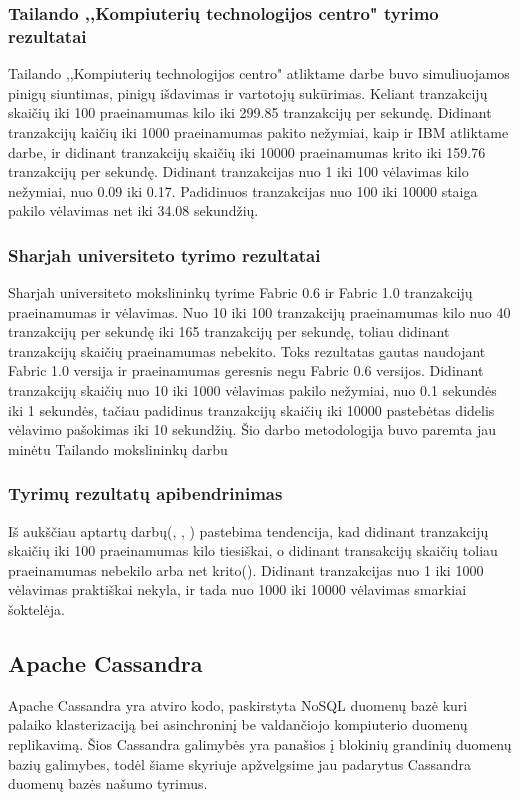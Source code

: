 \documentclass{VUMIFPSkursinis}
\begin{document}
		\subsubsection{Tailando ,,Kompiuterių technologijos centro" tyrimo rezultatai}
			Tailando ,,Kompiuterių technologijos centro" atliktame darbe buvo simuliuojamos pinigų siuntimas, pinigų išdavimas ir vartotojų sukūrimas. Keliant tranzakcijų skaičių iki 100 praeinamumas kilo iki 299.85 tranzakcijų per sekundę. Didinant tranzakcijų kaičių iki 1000 praeinamumas pakito nežymiai, kaip ir IBM \cite{IMBResearch} atliktame darbe, ir didinant tranzakcijų skaičių iki 					10000 praeinamumas krito iki 159.76 tranzakcijų per sekundę. 
			Didinant tranzakcijas nuo 1 iki 100 vėlavimas kilo nežymiai, nuo 0.09 iki 0.17. Padidinuos tranzakcijas nuo 100 iki 10000 staiga pakilo vėlavimas net iki 34.08 sekundžių.
		\subsubsection{Sharjah universiteto tyrimo rezultatai}
			Sharjah universiteto mokslininkų tyrime \cite{ShaFabPerf} Fabric 0.6 ir Fabric 1.0 tranzakcijų praeinamumas ir vėlavimas. Nuo 10 iki 100 tranzakcijų praeinamumas kilo nuo 40 tranzakcijų per sekundę iki 165 tranzakcijų per sekundę, toliau didinant tranzakcijų skaičių praeinamumas nebekito. Toks rezultatas gautas naudojant Fabric 1.0 versija ir praeinamumas geresnis negu 					Fabric 0.6 versijos. 
			Didinant tranzakcijų skaičių nuo 10 iki 1000 vėlavimas pakilo nežymiai, nuo 0.1 sekundės iki 1 sekundės, tačiau padidinus tranzakcijų skaičių iki 10000 pastebėtas didelis vėlavimo pašokimas iki 10 sekundžių.
			Šio darbo metodologija buvo paremta jau minėtu Tailando mokslininkų darbu \cite{ThailandPerf}
		\subsubsection{Tyrimų rezultatų apibendrinimas}
			Iš aukščiau aptartų darbų(\cite{IMBResearch}, \cite{ThailandPerf}, \cite{ShaFabPerf}) pastebima tendencija, kad didinant tranzakcijų skaičių iki 100 praeinamumas kilo tiesiškai, o didinant transakcijų skaičių toliau praeinamumas nebekilo arba net krito(\cite{ThailandPerf}).
			\newline
			Didinant tranzakcijas nuo 1 iki 1000 vėlavimas praktiškai nekyla, ir tada nuo 1000 iki 10000 vėlavimas smarkiai šoktelėja. 
	\subsection{Apache Cassandra}
		Apache Cassandra yra atviro kodo, paskirstyta NoSQL duomenų bazė kuri palaiko klasterizaciją bei asinchroninį be valdančiojo kompiuterio duomenų replikavimą. Šios Cassandra 				galimybės yra panašios į blokinių grandinių duomenų bazių galimybes, todėl šiame skyriuje apžvelgsime jau padarytus 
		Cassandra duomenų bazės našumo tyrimus. 
\end{document}
